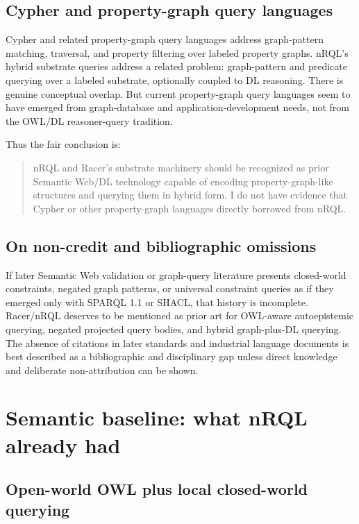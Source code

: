 \documentclass[11pt,letterpaper]{article}
\newcommand{\nrql}{nRQL}
\begin{document}
\subsection{Cypher and property-graph query languages}

Cypher and related property-graph query languages address graph-pattern matching, traversal, and property filtering over labeled property graphs. \nrql{}'s hybrid substrate queries address a related problem: graph-pattern and predicate querying over a labeled substrate, optionally coupled to DL reasoning. There is genuine conceptual overlap. But current property-graph query languages seem to have emerged from graph-database and application-development needs, not from the OWL/DL reasoner-query tradition.

Thus the fair conclusion is:

\begin{quote}
\nrql{} and Racer's substrate machinery should be recognized as prior Semantic Web/DL technology capable of encoding property-graph-like structures and querying them in hybrid form. I do not have evidence that Cypher or other property-graph languages directly borrowed from \nrql{}.
\end{quote}

\subsection{On non-credit and bibliographic omissions}

If later Semantic Web validation or graph-query literature presents closed-world constraints, negated graph patterns, or universal constraint queries as if they emerged only with SPARQL 1.1 or SHACL, that history is incomplete. Racer/\nrql{} deserves to be mentioned as prior art for OWL-aware autoepistemic querying, negated projected query bodies, and hybrid graph-plus-DL querying. The absence of citations in later standards and industrial language documents is best described as a bibliographic and disciplinary gap unless direct knowledge and deliberate non-attribution can be shown.


\section{Semantic baseline: what nRQL already had}

\subsection{Open-world OWL plus local closed-world querying}
\end{document}

